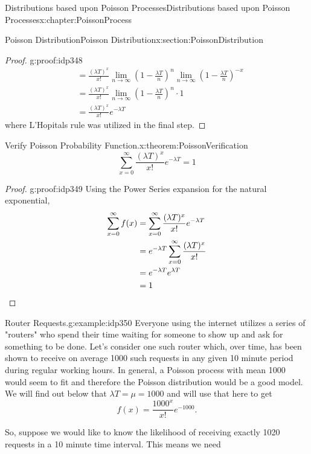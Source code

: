 \documentclass[oneside,10pt,]{book}
\newcommand{\qedhere}{\relax}
\numberwithin{equation}{section}
\begin{document}
\begin{chapterptx}{Distributions based upon Poisson Processes}{}{Distributions based upon Poisson Processes}{}{}{x:chapter:PoissonProcess}
\begin{sectionptx}{Poisson Distribution}{}{Poisson Distribution}{}{}{x:section:PoissonDistribution}
\begin{proof}{}{g:proof:idp348}
\begin{align*}
& = \frac{(\lambda T)^x}{x!} 
\lim_{n \rightarrow \infty} (1- \frac{\lambda T}{n})^{n}
\lim_{n \rightarrow \infty} (1- \frac{\lambda T}{n})^{-x}\\
& = \frac{(\lambda T)^x}{x!} 
\lim_{n \rightarrow \infty} (1- \frac{\lambda T}{n})^{n} \cdot 1\\
& = \frac{(\lambda T)^x}{x!} 
e^{-\lambda T}
\end{align*}
where L'Hopitals rule was utilized in the final step.%
\end{proof}
%
\par
\begin{theorem}{Verify Poisson Probability Function.}{}{x:theorem:PoissonVerification}%
%
\begin{equation*}
\sum_{x=0}^{\infty} \frac{(\lambda T)^x}{x!} e^{-\lambda T} = 1
\end{equation*}
%
\end{theorem}
\begin{proof}{}{g:proof:idp349}
Using the Power Series expansion for the natural exponential,%
\begin{align*}
\sum_{x=0}^{\infty} f(x) & = \sum_{x=0}^{\infty} \frac{(\lambda T)^x}{x!} e^{-\lambda T} \\
& = e^{-\lambda T} \sum_{x=0}^{\infty} \frac{(\lambda T)^x}{x!} \\
& = e^{-\lambda T} e^{\lambda T}  \\
& = 1\qedhere
\end{align*}
%
\end{proof}
%
\par
\begin{example}{Router Requests.}{g:example:idp350}%
Everyone using the internet utilizes a series of "routers" who spend their time waiting for someone to show up and ask for something to be done. Let's consider one such router which, over time, has been shown to receive on average 1000 such requests in any given 10 minute period during regular working hours. In general, a Poisson process with mean 1000 would seem to fit and therefore the Poisson distribution would be a good model. We will find out below that \(\lambda T = \mu = 1000\) and will use that here to get%
\begin{equation*}
f(x) = \frac{1000^x}{x!} e^{-1000}.
\end{equation*}
%
\par
So, suppose we would like to know the likelihood of receiving exactly 1020 requests in a 10 minute time interval.  This means we need%
\begin{equation*}

\end{equation*}
\end{example}
\end{sectionptx}
\end{chapterptx}
\end{document}
